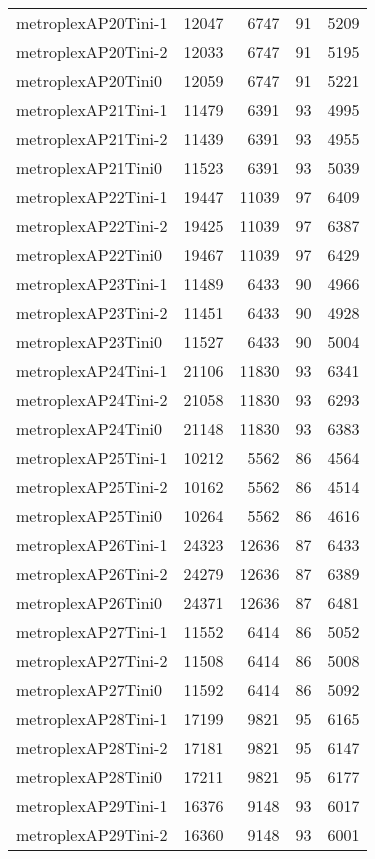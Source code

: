 \begin{longtable}{lrrrr}
metroplexAP20Tini-1 & 12047 & 6747 & 91 & 5209 \\
metroplexAP20Tini-2 & 12033 & 6747 & 91 & 5195 \\
metroplexAP20Tini0 & 12059 & 6747 & 91 & 5221 \\
metroplexAP21Tini-1 & 11479 & 6391 & 93 & 4995 \\
metroplexAP21Tini-2 & 11439 & 6391 & 93 & 4955 \\
metroplexAP21Tini0 & 11523 & 6391 & 93 & 5039 \\
metroplexAP22Tini-1 & 19447 & 11039 & 97 & 6409 \\
metroplexAP22Tini-2 & 19425 & 11039 & 97 & 6387 \\
metroplexAP22Tini0 & 19467 & 11039 & 97 & 6429 \\
metroplexAP23Tini-1 & 11489 & 6433 & 90 & 4966 \\
metroplexAP23Tini-2 & 11451 & 6433 & 90 & 4928 \\
metroplexAP23Tini0 & 11527 & 6433 & 90 & 5004 \\
metroplexAP24Tini-1 & 21106 & 11830 & 93 & 6341 \\
metroplexAP24Tini-2 & 21058 & 11830 & 93 & 6293 \\
metroplexAP24Tini0 & 21148 & 11830 & 93 & 6383 \\
metroplexAP25Tini-1 & 10212 & 5562 & 86 & 4564 \\
metroplexAP25Tini-2 & 10162 & 5562 & 86 & 4514 \\
metroplexAP25Tini0 & 10264 & 5562 & 86 & 4616 \\
metroplexAP26Tini-1 & 24323 & 12636 & 87 & 6433 \\
metroplexAP26Tini-2 & 24279 & 12636 & 87 & 6389 \\
metroplexAP26Tini0 & 24371 & 12636 & 87 & 6481 \\
metroplexAP27Tini-1 & 11552 & 6414 & 86 & 5052 \\
metroplexAP27Tini-2 & 11508 & 6414 & 86 & 5008 \\
metroplexAP27Tini0 & 11592 & 6414 & 86 & 5092 \\
metroplexAP28Tini-1 & 17199 & 9821 & 95 & 6165 \\
metroplexAP28Tini-2 & 17181 & 9821 & 95 & 6147 \\
metroplexAP28Tini0 & 17211 & 9821 & 95 & 6177 \\
metroplexAP29Tini-1 & 16376 & 9148 & 93 & 6017 \\
metroplexAP29Tini-2 & 16360 & 9148 & 93 & 6001 \\

\end{longtable}
